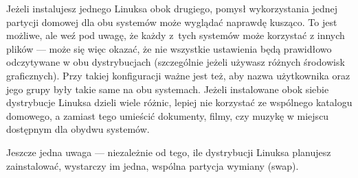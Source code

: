 Jeżeli instalujesz jednego Linuksa obok drugiego, pomysł wykorzystania jednej partycji domowej dla obu systemów może wyglądać naprawdę kusząco. To jest możliwe, ale weź pod uwagę, że każdy z~tych systemów może korzystać z innych plików --- może się więc okazać, że nie wszystkie ustawienia będą prawidłowo odczytywane w obu dystrybucjach (szczególnie jeżeli używasz różnych środowisk graficznych). Przy takiej konfiguracji ważne jest też, aby nazwa użytkownika oraz jego grupy były takie same na obu systemach. Jeżeli instalowane obok siebie dystrybucje Linuksa dzieli wiele różnic, lepiej nie korzystać ze wspólnego katalogu domowego, a zamiast tego umieścić dokumenty, filmy, czy muzykę w miejscu dostępnym dla obydwu systemów.

Jeszcze jedna uwaga --- niezależnie od tego, ile dystrybucji Linuksa planujesz zainstalować, wystarczy im jedna, wspólna partycja wymiany (swap).
